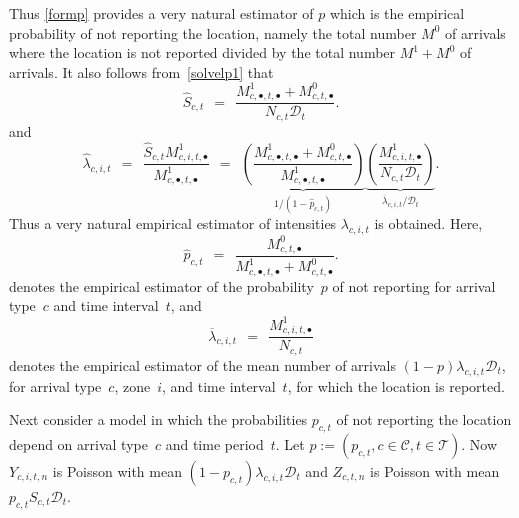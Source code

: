 Thus \eqref{formp} provides a very natural estimator of $p$ which is the empirical probability of not reporting the location, namely the total number $M^{0}$ of arrivals where the location is not reported divided by the total number $M^{1} + M^{0}$ of arrivals.
It also follows from~\eqref{solvelp1} that
\begin{equation}
\label{lambdaf1}
\hat{S}_{c,t} \ \ = \ \ \frac{M_{c,\bullet,t,\bullet}^{1} + M_{c,t,\bullet}^{0}}{N_{c,t} \mathcal{D}_{t}}.
\end{equation}
and
\begin{equation}
\label{lambdaf}
\hat{\lambda}_{c,i,t} \ \ = \ \ \frac{\hat{S}_{c,t} M_{c,i,t,\bullet}^{1}}{M_{c,\bullet,t,\bullet}^{1}}
\ \ = \ \ \underbrace{\left(\frac{M_{c,\bullet,t,\bullet}^{1} + M_{c,t,\bullet}^{0}}{M_{c,\bullet,t,\bullet}^{1}}\right)}_{1 / (1 - \hat{p}_{c,t})}
\underbrace{\left(\frac{M_{c,i,t,\bullet}^{1}}{N_{c,t} \mathcal{D}_{t}}\right)}_{\overline{\lambda}_{c,i,t} / \mathcal{D}_{t}}.
\end{equation}
Thus a very natural empirical estimator of intensities $\lambda_{c,i,t}$ is obtained.
Here,
\begin{equation}
\label{estimpct}
\hat{p}_{c,t} \ \ = \ \ \frac{M_{c,t,\bullet}^{0}}{M_{c,\bullet,t,\bullet}^{1} + M_{c,t,\bullet}^{0}}.
\end{equation}
denotes the empirical estimator of the probability~$p$ of not reporting for arrival type~$c$ and time interval~$t$, and
$$
\overline{\lambda}_{c,i,t} \ \ = \ \ \frac{M_{c,i,t,\bullet}^{1}}{N_{c,t}}
$$
denotes the empirical estimator of the mean number of arrivals $(1-p) \lambda_{c,i,t} \mathcal{D}_{t}$, for arrival type~$c$, zone~$i$, and time interval~$t$, for which the location is reported.

Next consider a model in which the probabilities $p_{c,t}$ of not reporting the location depend on arrival type~$c$ and time period~$t$.
Let $p := (p_{c,t}, c \in \mathcal{C}, t \in \mathcal{T})$.
Now $Y_{c,i,t,n}$ is Poisson with mean $(1-p_{c,t}) \lambda_{c,i,t} \mathcal{D}_{t}$ and $Z_{c,t,n}$ is Poisson with mean $p_{c,t} S_{c,t} \mathcal{D}_{t}$.

